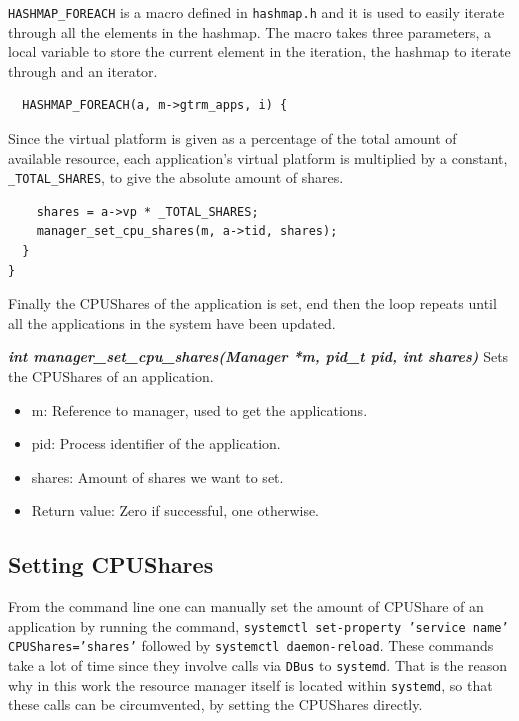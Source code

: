\documentclass[nobiblatex]{LTHthesis}
\begin{document}
\texttt{HASHMAP\_FOREACH} is a macro defined in \texttt{hashmap.h} and it is
used to easily iterate through all the elements in the hashmap. 
The macro takes three parameters, a local variable to store the current
element in the iteration, the hashmap to iterate through and an iterator.
\begin{lstlisting}
  HASHMAP_FOREACH(a, m->gtrm_apps, i) {
\end{lstlisting}
Since the virtual platform is given as a percentage of the total amount of
available resource, each application's virtual platform is multiplied by a
constant, \texttt{\_TOTAL\_SHARES}, to give the absolute amount of shares.
\begin{lstlisting}
    shares = a->vp * _TOTAL_SHARES;
    manager_set_cpu_shares(m, a->tid, shares);
  }
}
\end{lstlisting}
Finally the CPUShares of the application is set, end then the loop repeats
until all the applications in the system have been updated.

\begin{framed}
	\begin{flushleft}	
		\textbf{\emph{{int manager\_set\_cpu\_shares(Manager *m, pid\_t pid, int shares)}}} \newline
		Sets the CPUShares of an application.
		\begin{itemize}
		\item m: Reference to manager, used to get the applications.
		\item pid: Process identifier of the application.
		\item shares: Amount of shares we want to set.
		\item Return value: Zero if successful, one otherwise.
		\end{itemize}
	\end{flushleft}	
\end{framed}

\subsection{Setting CPUShares}
From the command line one can manually set the amount of CPUShare of 
an application by running the command, 
\texttt{systemctl set-property 'service name' CPUShares='shares'} followed 
by \texttt{systemctl daemon-reload}. These commands take a lot of time since
they involve calls via \texttt{DBus} to \texttt{systemd}. That is the reason
why in this work the resource manager itself is located within 
\texttt{systemd}, so that these calls can be circumvented, by setting 
the CPUShares directly.
\end{document}

